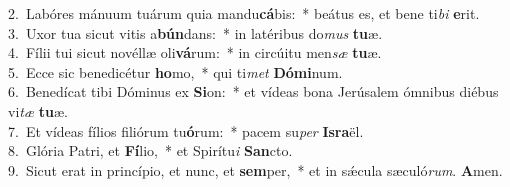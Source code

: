 {2.~}Labóres mánuum tuárum quia mandu\textbf{cá}bis:~* beátus es, et bene ti\textit{bi} \textbf{e}rit.\\
{3.~}Uxor tua sicut vitis a\textbf{bún}dans:~* in latéribus do\textit{mus} \textbf{tu}æ.\\
{4.~}Fílii tui sicut novéllæ oli\textbf{vá}rum:~* in circúitu men\textit{sæ} \textbf{tu}æ.\\
{5.~}Ecce sic benedicétur \textbf{ho}mo,~* qui ti\textit{met} \textbf{Dó}\textbf{mi}num.\\
{6.~}Benedícat tibi Dóminus ex \textbf{Si}on:~* et vídeas bona Jerúsalem ómnibus diébus vi\textit{tæ} \textbf{tu}æ.\\
{7.~}Et vídeas fílios filiórum tu\textbf{ó}rum:~* pacem su\textit{per} \textbf{Is}\textbf{ra}ël.\\
{8.~}Glória Patri, et \textbf{Fí}lio,~* et Spirítu\textit{i} \textbf{San}cto.\\
{9.~}Sicut erat in princípio, et nunc, et \textbf{sem}per,~* et in sǽcula sæculó\textit{rum}. \textbf{A}men.\\
